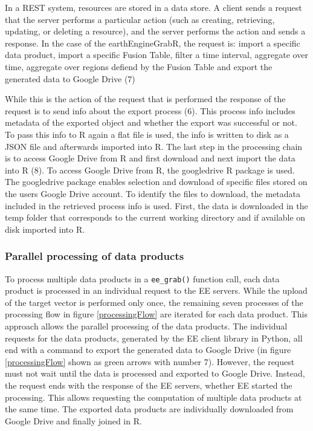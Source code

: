 In a REST system, resources are stored in a data store. A client sends a request that the server performs a particular action (such as creating, retrieving, updating, or deleting a resource), and the server performs the action and sends a response. In the case of the earthEngineGrabR, the request is: import a specific data product, import a specific Fusion Table, filter a time interval, aggregate over time, aggregate over regions defiend by the Fusion Table and export the generated data to Google Drive (7)

While this is the action of the request that is performed the response of the request is to send info about the export process (6). This process info includes metadata of the exported object and whether the export was successful or not. To pass this info to R again a flat file is used, the info is written to disk as a JSON file and afterwards imported into R. The last step in the processing chain is to access Google Drive from R and first download and next import the data into R (8). To access Google Drive from R, the googledrive R package is used. The googledrive package enables selection and download of specific files stored on the users Google Drive account. To identify the files to download, the metadata included in the retrieved process info is used. First, the data is downloaded in the temp folder that corresponds to the current working directory and if available on disk imported into R.

\subsubsection{Parallel processing of data products}


To process multiple data products in a \texttt{ee\_grab()} function call, each data product is processed in an individual request to the EE servers. While the upload of the target vector is performed only once, the remaining seven processes of the processing flow in figure \ref{processingFlow} are iterated for each data product. This approach allows the parallel processing of the data products. The individual requests for the data products, generated by the EE client library in Python, all end with a command to export the generated data to Google Drive (in figure \ref{processingFlow} shown as green arrows with number 7). However, the request must not wait until the data is processed and exported to Google Drive. Instead, the request ends with the response of the EE servers, whether EE started the processing. 
This allows requesting the computation of multiple data products at the same time. The exported data products are individually downloaded from Google Drive and finally joined in R.


